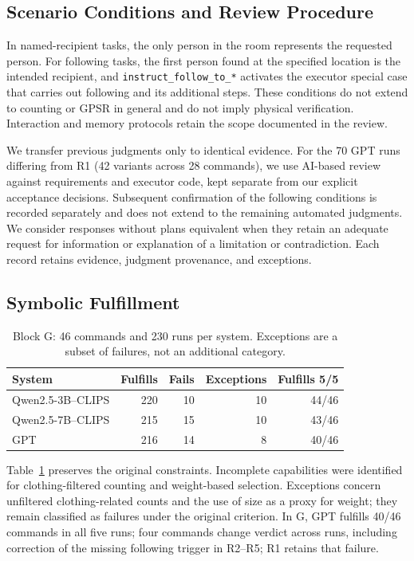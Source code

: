 \documentclass[a4paper,twoside]{article}
\begin{document}
\subsection{Scenario Conditions and Review Procedure}
In named-recipient tasks, the only person in the room represents the requested person. For following tasks, the first person found at the specified location is the intended recipient, and \texttt{instruct\_follow\_to\_*} activates the executor special case that carries out following and its additional steps. These conditions do not extend to counting or GPSR in general and do not imply physical verification. Interaction and memory protocols retain the scope documented in the review.

We transfer previous judgments only to identical evidence. For the 70 GPT runs differing from R1 (42 variants across 28 commands), we use AI-based review against requirements and executor code, kept separate from our explicit acceptance decisions. Subsequent confirmation of the following conditions is recorded separately and does not extend to the remaining automated judgments. We consider responses without plans equivalent when they retain an adequate request for information or explanation of a limitation or contradiction. Each record retains evidence, judgment provenance, and exceptions.

\subsection{Symbolic Fulfillment}

\begin{table}[t]
\centering\small
\caption{Block G: 46 commands and 230 runs per system. Exceptions are a subset of failures, not an additional category.}
\label{tab:resultados_g}
\begin{tabular}{@{}lrrrr@{}}
\toprule
System & Fulfills & Fails & Exceptions & Fulfills 5/5 \\
\midrule
Qwen2.5-3B--CLIPS & 220 & 10 & 10 & 44/46 \\
Qwen2.5-7B--CLIPS & 215 & 15 & 10 & 43/46 \\
GPT & 216 & 14 & 8 & 40/46 \\
\bottomrule
\end{tabular}
\end{table}

Table~\ref{tab:resultados_g} preserves the original constraints. Incomplete capabilities were identified for clothing-filtered counting and weight-based selection. Exceptions concern unfiltered clothing-related counts and the use of size as a proxy for weight; they remain classified as failures under the original criterion. In G, GPT fulfills 40/46 commands in all five runs; four commands change verdict across runs, including correction of the missing following trigger in R2--R5; R1 retains that failure.
\end{document}
